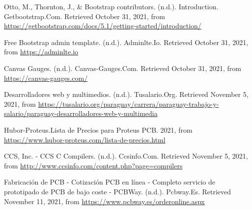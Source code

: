 \begin{thebibliography}{99}
 Otto, M., Thornton, J., \& Bootstrap contributors. (n.d.). Introduction. Getbootstrap.Com. Retrieved October 31, 2021, from \url{https://getbootstrap.com/docs/5.1/getting-started/introduction/}

 Free Bootstrap admin template. (n.d.). Adminlte.Io. Retrieved October 31, 2021, from \url{https://adminlte.io}

 Canvas Gauges. (n.d.). Canvas-Gauges.Com. Retrieved October 31, 2021, from \url{https://canvas-gauges.com/}



 Desarrolladores web y multimedios. (n.d.). Tusalario.Org. Retrieved November 5, 2021, from \url{https://tusalario.org/paraguay/carrera/paraguay-trabajo-y-salario/paraguay-desarrolladores-web-y-multimedia}

 Hubor-Proteus.Lista de Precios para Proteus PCB. 2021, from \url{https://www.hubor-proteus.com/lista-de-precios.html}

CCS, Inc. - CCS C Compilers. (n.d.). Ccsinfo.Com. Retrieved November 5, 2021, from \url{http://www.ccsinfo.com/content.php?page=compilers}

 Fabricación de PCB - Cotización PCB en línea - Completo servicio de prototipado de PCB de bajo coste - PCBWay. (n.d.). Pcbway.Es. Retrieved November 11, 2021, from \url{https://www.pcbway.es/orderonline.aspx}




\end{thebibliography}